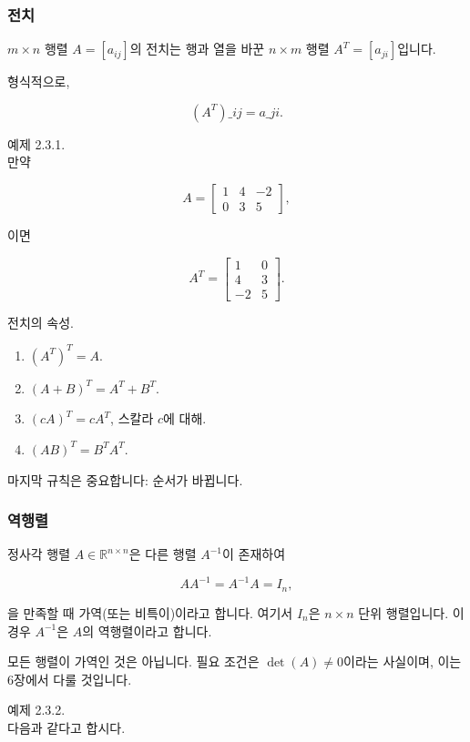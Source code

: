 \documentclass[
  12pt,
  a4paper,
]{article}
\begin{document}
\subsubsection{전치}\label{the-transpose}

\(m \times n\) 행렬 \(A = [a_{ij}]\)의 전치는 행과 열을 바꾼 \(n \times m\) 행렬 \(A^T = [a_{ji}]\)입니다.

형식적으로,

\[(A^T)\_{ij} = a\_{ji}.\]

예제 2.3.1.\\
만약

\[A = \begin{bmatrix}
1 & 4 & -2 \\
0 & 3 & 5
\end{bmatrix},\]

이면

\[A^T = \begin{bmatrix}
1 & 0 \\
4 & 3 \\
-2 & 5
\end{bmatrix}.\]

전치의 속성.

\begin{enumerate}
\def\labelenumi{\arabic{enumi}.}
\item
  \((A^T)^T = A\).
\item
  \((A+B)^T = A^T + B^T\).
\item
  \((cA)^T = cA^T\), 스칼라 \(c\)에 대해.
\item
  \((AB)^T = B^T A^T\).
\end{enumerate}

마지막 규칙은 중요합니다: 순서가 바뀝니다.

\subsubsection{역행렬}\label{the-inverse}

정사각 행렬 \(A \in \mathbb{R}^{n \times n}\)은 다른 행렬 \(A^{-1}\)이 존재하여

\[AA^{-1} = A^{-1}A = I_n,\]

을 만족할 때 가역(또는 비특이)이라고 합니다. 여기서 \(I_n\)은 \(n \times n\) 단위 행렬입니다. 이 경우 \(A^{-1}\)은 \(A\)의 역행렬이라고 합니다.

모든 행렬이 가역인 것은 아닙니다. 필요 조건은 \(\det(A) \neq 0\)이라는 사실이며, 이는 6장에서 다룰 것입니다.

예제 2.3.2.\\
다음과 같다고 합시다.
\end{document}
